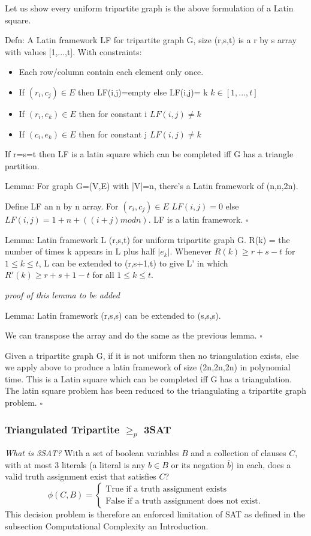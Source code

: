 \documentclass[a4paper,12pt]{article}
\begin{document}
Let us show every uniform tripartite graph is the above formulation of a Latin square.

Defn: A Latin framework LF for tripartite graph G, size (r,s,t) is a r by s array with values [1,...,t]. With constraints:
\begin{itemize}
\item{Each row/column contain each element only once.}
\item{If $(r_i,c_j)\in E$ then LF(i,j)=empty else LF(i,j)= k $k\in [1,...,t]$}
\item{If $(r_i,e_k)\in E$  then for constant i $LF(i,j)\neq k$}
\item{If $(c_i,e_k)\in E$  then for constant j $LF(i,j)\neq k$}
\end{itemize}
If r=s=t then LF is a latin square which can be completed iff G has a triangle partition.

Lemma: For graph G=(V,E) with |V|=n, there's a Latin framework of (n,n,2n).

Define LF an n by n array. For $(r_i,c_j)\in E$ $LF(i,j)=0$ else $LF(i,j)=1+n+((i+j)mod n)$. LF is a latin framework. $\square$

Lemma: Latin framework L  (r,s,t) for uniform tripartite graph G. R(k) = the number of times k appears in L plus half $|e_k|$. Whenever $R(k)\ge r+s-t$ for $1 \le k \le t$, L can be extended to (r,s+1,t) to give L' in which $R'(k)\ge r + s+1-t$ for all $1\le k \le t$.

\textit{proof of this lemma to be added}

Lemma: Latin framework (r,s,s) can be extended to (s,s,s).

We can transpose the array and do the same as the previous lemma. $\square$

Given a tripartite graph G, if it is not uniform then no triangulation exists, else we apply above to produce a latin framework of size (2n,2n,2n) in polynomial time. This is a Latin square which can be completed iff G has a triangulation. The latin square problem has been reduced to the triangulating a tripartite graph problem. $\square$




\subsubsection{Triangulated Tripartite $\geq_p$ 3SAT}

\textit{What is 3SAT?} With a set of boolean variables $B$ and a collection of clauses $C$, with at most 3 literals (a literal is any $b \in B$ or its negation $\bar{b}$) in each, does a valid truth assignment exist that satisfies $C$?
		\begin{equation}
		        \phi (C,B) = \begin{cases}
		            \text{True if a truth assignment exists} \\
		            \text{False if a truth assignment does not exist}.
				\end{cases}
		\end{equation}
This decision problem is therefore an enforced limitation of SAT as defined in the subsection Computational Complexity an Introduction.
\end{document}
